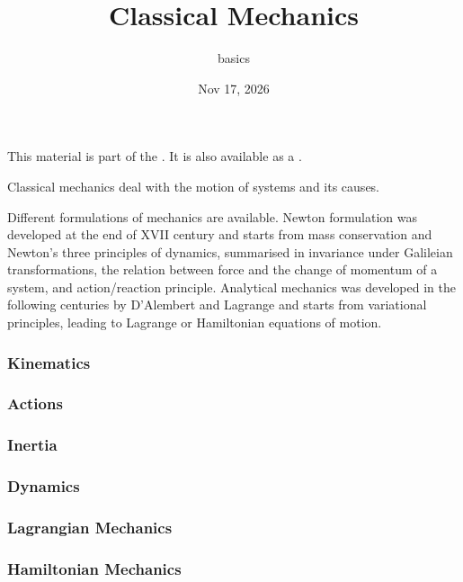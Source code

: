 \documentclass[letterpaper,10pt,english]{jupyterBook}
\title{Classical Mechanics}
\date{Nov 17, 2026}
\author{basics}
\begin{document}
\pagestyle{empty}
\sphinxmaketitle
\pagestyle{plain}
\sphinxtableofcontents
\pagestyle{normal}
\label{\detokenize{intro::doc}}


\sphinxAtStartPar
This material is part of the . It is also available as a .

\sphinxAtStartPar
Classical mechanics deal with the motion of systems and its causes.

\sphinxAtStartPar
Different formulations of mechanics are available. Newton formulation was developed at the end of XVII century and starts from mass conservation and Newton’s three principles of dynamics, summarised in invariance under Galileian transformations, the relation between force and the change of momentum of a system, and action/reaction principle. Analytical mechanics was developed in the following centuries by D’Alembert and Lagrange and starts from variational principles, leading to Lagrange or Hamiltonian equations of motion.

\sphinxAtStartPar
{}
\subsubsection*{Kinematics}
\subsubsection*{Actions}
\subsubsection*{Inertia}
\subsubsection*{Dynamics}

\sphinxAtStartPar
{}
\subsubsection*{Lagrangian Mechanics}
\subsubsection*{Hamiltonian Mechanics}
\end{document}
